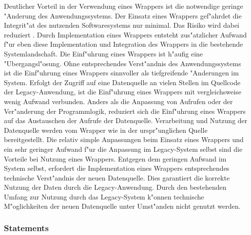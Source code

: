 



Deutlicher Vorteil in der Verwendung eines Wrappers ist die notwendige geringe "Anderung des Anwendungssystems. Der Einsatz eines Wrappers gef"ahrdet die Integrit"at des nutzenden Softwaresystems nur minimal. Das Risiko wird dabei reduziert \citep{henrard-2002}. 
\lb
Durch Implementation eines Wrappers entsteht zus"atzlicher Aufwand f"ur eben diese Implementation und Integration des Wrappers in die bestehende Systemlandschaft. Die Einf"uhrung eines Wrappers ist h"aufig eine "Ubergangsl"osung. Ohne entsprechendes Verst"andnis des Anwendungssystems ist die Einf"uhrung eines Wrappers sinnvoller als tiefgreifende "Anderungen im System. 
\lb
Erfolgt der Zugriff auf eine Datenquelle an vielen Stellen im Quellcode der Legacy-Anwendung, ist die Einf"uhrung eines Wrappers mit vergleichsweise wenig Aufwand verbunden. Anders als die Anpassung von Aufrufen oder der Ver"anderung der Programmlogik, reduziert sich die Einf"uhrung eines Wrappers auf das Austauschen der Aufrufe der Datenquelle. Verarbeitung und Nutzung der Datenquelle werden vom Wrapper wie in der urspr"unglichen Quelle bereitgestellt. Die relativ simple Anpassungen beim Einsatz eines Wrappers und ein sehr geringer Aufwand f"ur die Anpassung im Legacy-System selbst sind die Vorteile bei Nutzung eines Wrappers. Entgegen dem geringen Aufwand im System selbst, erfordert die Implementation eines Wrappers entsprechendes technische Verst"andnis der neuen Datenquelle. Dies garantiert die korrekte Nutzung der Daten durch die Legacy-Anwendung. Durch den bestehenden Umfang zur Nutzung durch das Legacy-System k"onnen technische M"oglichkeiten der neuen Datenquelle unter Umst"anden nicht genutzt werden.

\subsubsection{Statements}

